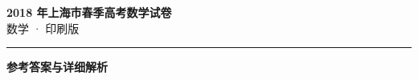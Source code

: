 \documentclass[zihao=5, a4paper]{ctexart}
\begin{document}
\begin{center}
  {\Large\bfseries 2018 年上海市春季高考数学试卷}\\[4pt]
  {\large 数学 · 印刷版}
\end{center}
\medskip
{}

\par\bigskip\hrule\bigskip
{}
\begin{center}{\large\bfseries 参考答案与详细解析}\end{center}
\smallskip

\end{document}
